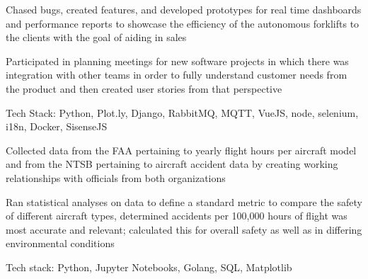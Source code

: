 \documentclass[letterpaper]{resume}
\begin{document}
\begin{compactitem}
\item Chased bugs, created features, and developed prototypes for real time dashboards and performance reports to showcase the efficiency of the autonomous forklifts to the clients with the goal of aiding in sales
\item Participated in planning meetings for new software projects in which there was integration with other teams in order to fully understand customer needs from the product and then created user stories from that perspective
\item Tech Stack: Python, Plot.ly, Django, RabbitMQ, MQTT, VueJS, node, selenium, i18n, Docker, SisenseJS
\end{compactitem}

\begin{compactitem}
\item Collected data from the FAA pertaining to yearly flight hours per aircraft model and from the NTSB pertaining to aircraft accident data by creating working relationships with officials from both organizations
\item Ran statistical analyses on data to define a standard metric to compare the safety of different aircraft types, determined accidents per 100,000 hours of flight was most accurate and relevant; calculated this for overall safety as well as in differing environmental conditions
\item Tech stack: Python, Jupyter Notebooks, Golang, SQL, Matplotlib
\end{compactitem}
\end{document}
